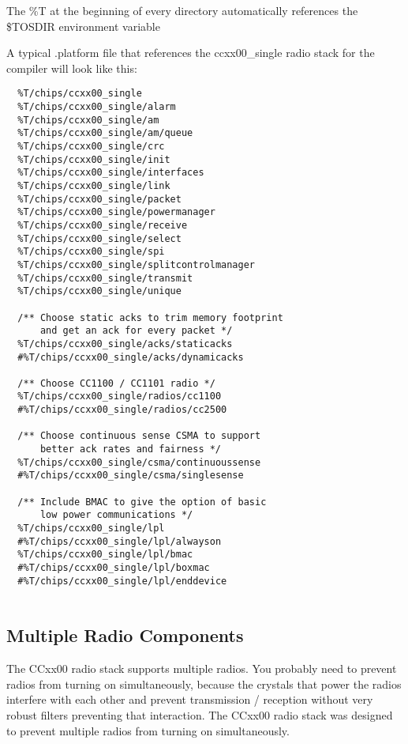 \documentclass{article}
\begin{document}
The \%T at the beginning of every directory automatically references the \$TOSDIR environment variable

A typical .platform file that references the ccxx00\_single radio stack for the compiler will look 
like this:

\begin{verbatim}
  %T/chips/ccxx00_single
  %T/chips/ccxx00_single/alarm
  %T/chips/ccxx00_single/am
  %T/chips/ccxx00_single/am/queue
  %T/chips/ccxx00_single/crc
  %T/chips/ccxx00_single/init
  %T/chips/ccxx00_single/interfaces
  %T/chips/ccxx00_single/link
  %T/chips/ccxx00_single/packet
  %T/chips/ccxx00_single/powermanager
  %T/chips/ccxx00_single/receive
  %T/chips/ccxx00_single/select
  %T/chips/ccxx00_single/spi
  %T/chips/ccxx00_single/splitcontrolmanager
  %T/chips/ccxx00_single/transmit
  %T/chips/ccxx00_single/unique
  
  /** Choose static acks to trim memory footprint 
      and get an ack for every packet */
  %T/chips/ccxx00_single/acks/staticacks
  #%T/chips/ccxx00_single/acks/dynamicacks
  
  /** Choose CC1100 / CC1101 radio */
  %T/chips/ccxx00_single/radios/cc1100
  #%T/chips/ccxx00_single/radios/cc2500
  
  /** Choose continuous sense CSMA to support 
      better ack rates and fairness */
  %T/chips/ccxx00_single/csma/continuoussense
  #%T/chips/ccxx00_single/csma/singlesense
  
  /** Include BMAC to give the option of basic 
      low power communications */
  %T/chips/ccxx00_single/lpl
  #%T/chips/ccxx00_single/lpl/alwayson
  %T/chips/ccxx00_single/lpl/bmac
  #%T/chips/ccxx00_single/lpl/boxmac
  #%T/chips/ccxx00_single/lpl/enddevice
  
\end{verbatim}

\subsection{Multiple Radio Components}
\label{sec:multipleradiocomponents}

The CCxx00 radio stack supports multiple radios. You probably need to prevent radios 
from turning on simultaneously, because the crystals that power the radios interfere with
each other and prevent transmission / reception without very robust filters preventing
that interaction.  The CCxx00 radio stack was designed to prevent multiple radios from
turning on simultaneously.
\end{document}
